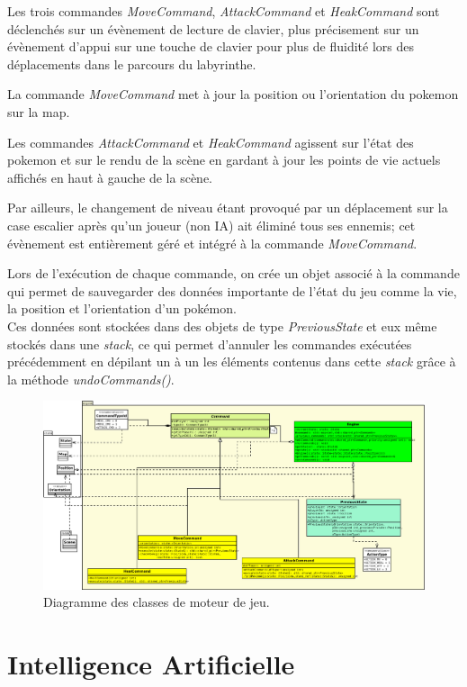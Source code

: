 \documentclass[a4paper,12pt]{article}
\begin{document}
Les trois commandes \emph{MoveCommand}, \emph{AttackCommand} et \emph{HeakCommand} sont déclenchés sur un évènement de lecture de clavier, plus précisement sur un évènement d'appui sur une touche de clavier pour plus de fluidité lors des déplacements dans le parcours du labyrinthe.

La commande \emph{MoveCommand} met à jour la position ou l'orientation du pokemon sur la map.

Les commandes \emph{AttackCommand} et \emph{HeakCommand} agissent sur l'état des pokemon et sur le rendu de la scène en gardant à jour les points de vie actuels affichés en haut à gauche de la scène.

Par ailleurs, le changement de niveau étant provoqué par un déplacement sur la case escalier après qu'un joueur (non IA) ait éliminé tous ses ennemis; cet évènement est entièrement géré et intégré à la commande \emph{MoveCommand}.

Lors de l'exécution de chaque commande, on crée un objet associé à la commande qui permet de sauvegarder des données importante de l'état du jeu comme la vie, la position et l'orientation d'un pokémon. 
\\Ces données sont stockées dans des objets de type \emph{PreviousState} et eux même stockés dans une \emph{stack}, ce qui permet d'annuler les commandes exécutées précédemment en dépilant un à un les éléments contenus dans cette \emph{stack} grâce à la méthode \emph{undoCommands()}.

    \begin{landscape}
    \begin{figure}[p]
    \includegraphics[width=0.9\paperheight]{engine.png}
    \caption{\label{uml:engine}Diagramme des classes de moteur de jeu.}
    \end{figure}
    \end{landscape}


    \section{Intelligence Artificielle}
\end{document}
